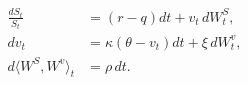 \documentclass{equation-sheet}
\begin{document}
\begin{equation*}
\begin{aligned}
\frac{dS_t}{S_t} &= (r-q)dt + v_t\,dW_t^S, \\
dv_t &= \kappa(\theta-v_t)dt + \xi\,dW_t^v, \\
d\langle W^S,W^v\rangle_t &= \rho\,dt.
\end{aligned}
\end{equation*}
\end{document}
